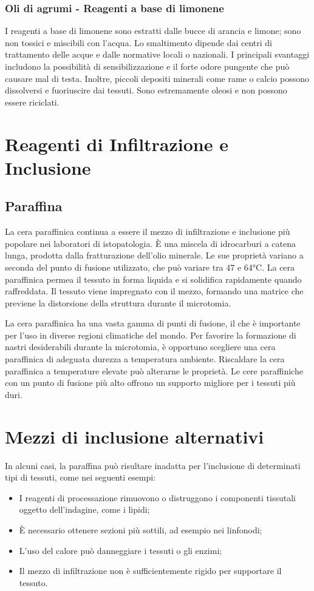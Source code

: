 \subsubsection{Oli di agrumi - Reagenti a base di limonene}
I reagenti a base di limonene sono estratti dalle bucce di arancia e limone; sono non tossici e miscibili con l'acqua. Lo smaltimento dipende dai centri di trattamento delle acque e dalle normative locali o nazionali. I principali svantaggi includono la possibilità di sensibilizzazione e il forte odore pungente che può causare mal di testa. Inoltre, piccoli depositi minerali come rame o calcio possono dissolversi e fuoriuscire dai tessuti. Sono estremamente oleosi e non possono essere riciclati.

\section{Reagenti di Infiltrazione e Inclusione}

\subsection{Paraffina}
La cera paraffinica continua a essere il mezzo di infiltrazione e inclusione più popolare nei laboratori di istopatologia. È una miscela di idrocarburi a catena lunga, prodotta dalla fratturazione dell'olio minerale. Le sue proprietà variano a seconda del punto di fusione utilizzato, che può variare tra 47 e 64°C. La cera paraffinica permea il tessuto in forma liquida e si solidifica rapidamente quando raffreddata. Il tessuto viene impregnato con il mezzo, formando una matrice che previene la distorsione della struttura durante il microtomia. 

La cera paraffinica ha una vasta gamma di punti di fusione, il che è importante per l'uso in diverse regioni climatiche del mondo. Per favorire la formazione di nastri desiderabili durante la microtomia, è opportuno scegliere una cera paraffinica di adeguata durezza a temperatura ambiente. Riscaldare la cera paraffinica a temperature elevate può alterarne le proprietà. Le cere paraffiniche con un punto di fusione più alto offrono un supporto migliore per i tessuti più duri.


\section{Mezzi di inclusione alternativi}
In alcuni casi, la paraffina può risultare inadatta per l'inclusione di determinati tipi di tessuti, come nei seguenti esempi:
\begin{itemize}
    \item I reagenti di processazione rimuovono o distruggono i componenti tissutali oggetto dell'indagine, come i lipidi;
    \item È necessario ottenere sezioni più sottili, ad esempio nei linfonodi;
    \item L'uso del calore può danneggiare i tessuti o gli enzimi;
    \item Il mezzo di infiltrazione non è sufficientemente rigido per supportare il tessuto.
\end{itemize}

